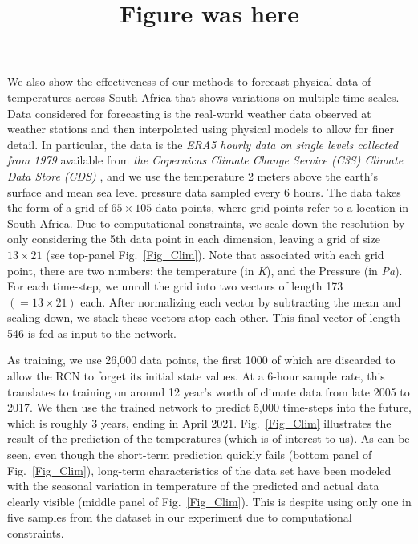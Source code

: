 \documentclass[12 pt]{article}
\begin{document}
We also show the effectiveness of our methods to forecast physical data of temperatures across South Africa that shows variations on multiple time scales. Data considered for forecasting is the real-world weather data observed at weather stations and then interpolated using physical models to allow for finer detail. In particular, the data is the {\it ERA5 hourly data on single levels collected from 1979}  available from {\it the Copernicus Climate Change Service (C3S) Climate Data Store (CDS)} \cite{era5data}, and we use the temperature 2 meters above the earth's surface and mean sea level pressure data sampled every 6 hours. The data takes the form of a grid of $65 \times 105$ data points, where grid points refer to a location in South Africa. Due to computational constraints, we scale down the resolution by only considering the 5th data point in each dimension, leaving a grid of size $13 \times 21$ (see top-panel Fig.~\ref{Fig_Clim}). Note that associated with each grid point, there are two numbers: the temperature (in {\it K}), and the Pressure (in {\it Pa}).  For each time-step, we unroll the grid into two vectors of length 173 $(= 13\times 21)$ each. After normalizing each vector by subtracting the mean and scaling down, we stack these vectors atop each other. This final vector of length 546 is fed as input to the network. 

As training, we use 26,000 data points, the first 1000 of which are discarded to allow the RCN to forget its initial state values. At a 6-hour sample rate, this translates to training on around 12 year's worth of climate data from late 2005 to 2017. We then use the trained network to predict 5,000 time-steps into the future,  which is roughly 3 years, ending in April 2021. 
Fig.~\ref{Fig_Clim} illustrates the result of the prediction of the temperatures (which is of interest to us). As can be seen, even though the short-term prediction quickly fails (bottom panel of Fig.~\ref{Fig_Clim}), long-term characteristics of the data set have been modeled with the seasonal variation in temperature of the predicted and actual data clearly visible (middle panel of Fig.~\ref{Fig_Clim}). This is despite using only one in five samples from the dataset in our experiment due to computational constraints. 

\title{Figure was here}
    
\end{document}
